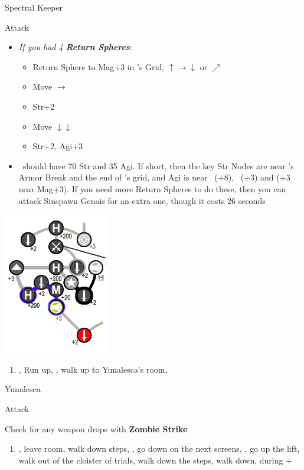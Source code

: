 \begin{battle}[52000]{Spectral Keeper}
  \begin{itemize}
    \summon{\bahamut}
    \bahamutf Attack
  \end{itemize}
\end{battle}
\vfill
\begin{spheregrid}
  \begin{itemize}
    \item \textit{If you had 4 \textbf{Return Spheres}}: 
    \begin{itemize}
    	\item Return Sphere to Mag+3 in \wakka's Grid, $\uparrow\rightarrow\downarrow$ or $\nearrow$
    	\item Move $\rightarrow$
    	\item Str+2
    	\item Move $\downarrow\downarrow$
    	\item Str+2, Agi+3
    	\end{itemize}
    \item \yuna\ should have 70 Str and 35 Agi. If short, then the key Str Nodes are near \tidus's Armor Break and the end of \wakka's grid, and Agi is near \lulu\ (+8), \rikku\ (+3) and \wakka (+3 near Mag+3). If you need more Return Spheres to do these, then you can attack Sinspawn Genais for an extra one, though it costs 26 seconds
  \end{itemize}
  \includegraphics[width=.5\columnwidth]{graphics/4_return_before_yunalesca}
\end{spheregrid}
\begin{enumerate}[resume]
  \item \save, Run up, \sd, walk up to Yunalesca's room, \sd
\end{enumerate}
\begin{battle}[132000]{Yunalesca}
  \begin{itemize}
    \summon{\bahamut}
    \bahamutf Attack
  \end{itemize}
  Check for any weapon drops with \textbf{Zombie Strike}
\end{battle}
\begin{enumerate}[resume]
  \item \sd, leave room, walk down steps, \sd, go down on the next screens, \save, go up the lift, walk out of the cloister of trials, walk down the steps, walk down, \sd during \cs+\skippablefmv
\end{enumerate}